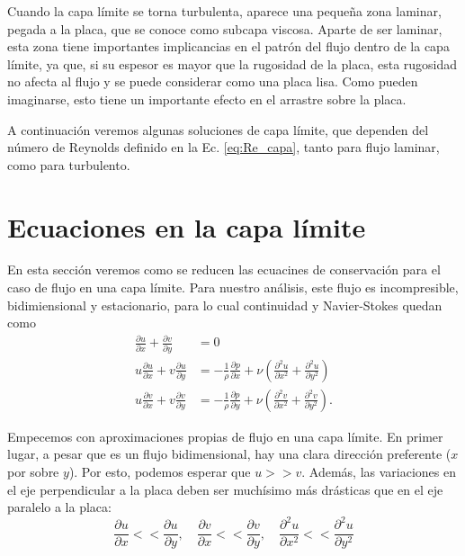 Cuando la capa límite se torna turbulenta, aparece una pequeña zona laminar, pegada a la placa, que se conoce como subcapa viscosa.
Aparte de ser laminar, esta zona tiene importantes implicancias en el patrón del flujo dentro de la capa límite, ya que, si su espesor es mayor que la rugosidad de la placa, esta rugosidad no afecta al flujo y se puede considerar como una placa lisa. 
Como pueden imaginarse, esto tiene un importante efecto en el arrastre sobre la placa.

A continuación veremos algunas soluciones de capa límite, que dependen del número de Reynolds definido en la Ec. \eqref{eq:Re_capa}, tanto para flujo laminar, como para turbulento.

\section*{Ecuaciones en la capa límite}
En esta sección veremos como se reducen las ecuacines de conservación para el caso de flujo en una capa límite.
Para nuestro análisis, este flujo es incompresible, bidimiensional y estacionario, para lo cual continuidad y Navier-Stokes quedan como
%
\begin{align}\label{eq:NS_capa}
\frac{\partial u}{\partial x} + \frac{\partial v}{\partial y} &= 0 \nonumber\\
u\frac{\partial u}{\partial x} + v\frac{\partial u}{\partial y} &= -\frac{1}{\rho}\frac{\partial p}{\partial x} + \nu\left( \frac{\partial^2u}{\partial x^2} + \frac{\partial^2u}{\partial y^2}\right) \nonumber\\
u\frac{\partial v}{\partial x} + v\frac{\partial v}{\partial y} &= -\frac{1}{\rho}\frac{\partial p}{\partial y} + \nu\left( \frac{\partial^2v}{\partial x^2} + \frac{\partial^2v}{\partial y^2}\right).
\end{align}

Empecemos con aproximaciones propias de flujo en una capa límite.
En primer lugar, a pesar que es un flujo bidimensional, hay una clara dirección preferente ($x$ por sobre $y$).
Por esto, podemos esperar que $u>>v$.
Además, las variaciones en el eje perpendicular a la placa deben ser muchísimo más drásticas que en el eje paralelo a la placa:
%
\begin{equation}
\frac{\partial u}{\partial x} << \frac{\partial u}{\partial y}, \quad \frac{\partial v}{\partial x} << \frac{\partial v}{\partial y}, \quad \frac{\partial^2 u}{\partial x^2} << \frac{\partial^2 u}{\partial y^2}
\end{equation}

